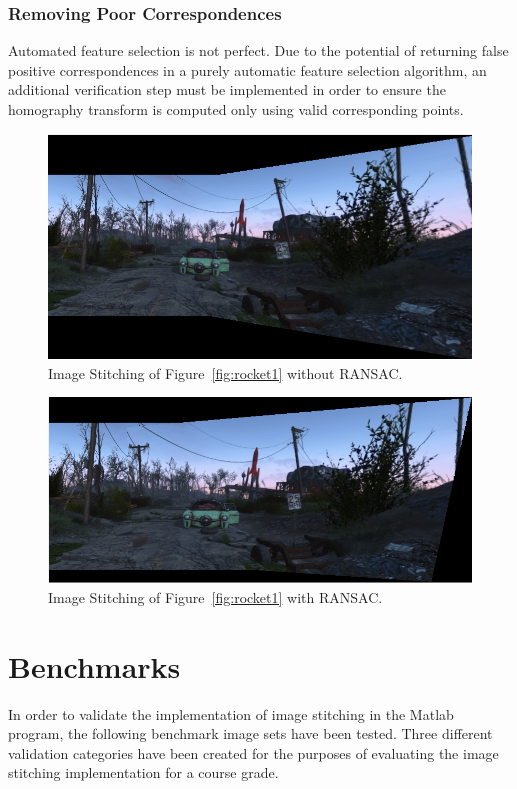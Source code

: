 \documentclass[12pt,journal,compsoc]{IEEEtran}
\begin{document}
\subsubsection{Removing Poor Correspondences}
Automated feature selection is not perfect. Due to the potential of returning false positive correspondences in a purely automatic feature selection algorithm, an additional verification step must be implemented in order to ensure the homography transform is computed only using valid corresponding points.

\begin{figure}[h]
	\centering
		  \centering
		  \includegraphics[width=1\linewidth]{img/rocket2}
		  \caption{Image Stitching of Figure~\ref{fig:rocket1} without RANSAC.}
		  \label{fig:rocket2}
\end{figure}

\begin{figure}[h]
	\centering
		  \centering
		  \includegraphics[width=1\linewidth]{img/rocket3}
		  \caption{Image Stitching of Figure~\ref{fig:rocket1} with RANSAC.}
		  \label{fig:rocket3}
\end{figure}

\section{Benchmarks}
In order to validate the implementation of image stitching in the Matlab program, the following benchmark image sets have been tested. Three different validation categories have been created for the purposes of evaluating the image stitching implementation for a course grade.
\end{document}
